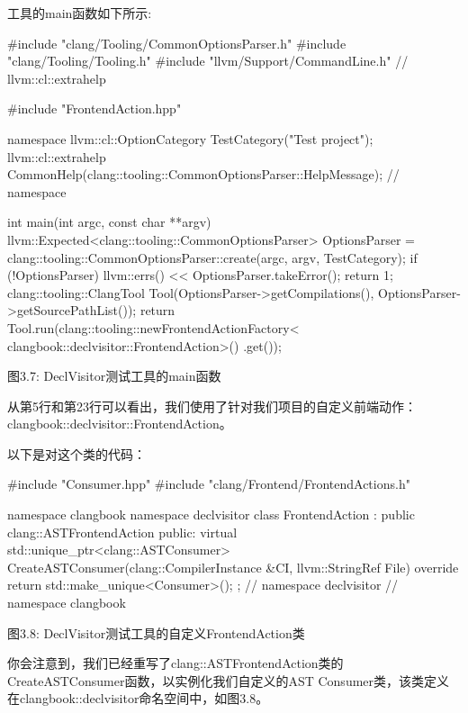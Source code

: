 工具的main函数如下所示:

\begin{cpp}
#include "clang/Tooling/CommonOptionsParser.h"
#include "clang/Tooling/Tooling.h"
#include "llvm/Support/CommandLine.h" // llvm::cl::extrahelp

#include "FrontendAction.hpp"

namespace {
  llvm::cl::OptionCategory TestCategory("Test project");
  llvm::cl::extrahelp
    CommonHelp(clang::tooling::CommonOptionsParser::HelpMessage);
} // namespace

int main(int argc, const char **argv) {
  llvm::Expected<clang::tooling::CommonOptionsParser> OptionsParser =
    clang::tooling::CommonOptionsParser::create(argc, argv, TestCategory);
  if (!OptionsParser) {
    llvm::errs() << OptionsParser.takeError();
    return 1;
  }
  clang::tooling::ClangTool Tool(OptionsParser->getCompilations(),
                                 OptionsParser->getSourcePathList());
  return Tool.run(clang::tooling::newFrontendActionFactory<
                       clangbook::declvisitor::FrontendAction>()
                       .get());
}
\end{cpp}

\begin{center}
图3.7: DeclVisitor测试工具的main函数
\end{center}

从第5行和第23行可以看出，我们使用了针对我们项目的自定义前端动作：clangbook::declvisitor::FrontendAction。

以下是对这个类的代码：

\begin{cpp}
#include "Consumer.hpp"
#include "clang/Frontend/FrontendActions.h"

namespace clangbook {
namespace declvisitor {
class FrontendAction : public clang::ASTFrontendAction {
public:
  virtual std::unique_ptr<clang::ASTConsumer>
  CreateASTConsumer(clang::CompilerInstance &CI,
                    llvm::StringRef File) override {
    return std::make_unique<Consumer>();
  }
};
} // namespace declvisitor
}// namespace clangbook
\end{cpp}

\begin{center}
 图3.8: DeclVisitor测试工具的自定义FrontendAction类
\end{center}

你会注意到，我们已经重写了clang::ASTFrontendAction类的CreateASTConsumer函数，以实例化我们自定义的AST Consumer类，该类定义在clangbook::declvisitor命名空间中，如图3.8。

